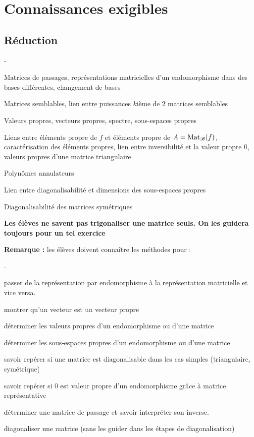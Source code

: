 \documentclass[11pt]{article}%
\begin{document}
\newpage


\section*{Connaissances exigibles}

\subsection*{Réduction}

\begin{noliste}{-}
 \item Matrices de passages, représentations matricielles d'un 
  endomorphisme dans des bases différentes, changement de bases
  \item Matrices semblables, lien entre puissances $k$ième de $2$ 
  matrices semblables
  \item Valeurs propres, vecteurs propres, spectre, sous-espaces propres
  \item Liens entre éléments propre de $f$ et éléments propre de 
  $A={\rm{Mat}}_{\mathscr{B}}(f)$, caractérisation des éléments propres, lien entre 
  inversibilité et la valeur propre $0$, valeurs propres d'une matrice 
  triangulaire
  \item Polynômes annulateurs
  \item Lien entre diagonalisabilité et dimensions des sous-espaces 
  propres
  \item Diagonalisabilité des matrices symétriques
  \item {\bf Les élèves ne savent pas trigonaliser une matrice seuls.
  On les guidera toujours pour un tel exercice}
\end{noliste}

\noindent
{\bf Remarque :} les élèves doivent connaître les méthodes pour :
\begin{noliste}{-}
\item passer de la représentation par endomorphisme à la 
représentation matricielle et vice versa.
\item montrer qu'un vecteur est un vecteur propre
\item déterminer les valeurs propres d'un endomorphisme ou 
d'une matrice
\item déterminer les sous-espaces propres d'un endomorphisme 
ou d'une matrice
\item savoir repérer si une matrice est diagonalisable dans les cas 
simples (triangulaire, symétrique)
\item savoir repérer si $0$ est valeur propre d'un endomorphisme grâce 
à matrice représentative
\item déterminer une matrice de passage et savoir interpréter 
son inverse.
\item diagonaliser une matrice (sans les guider dans les étapes de 
diagonalisation)
\end{noliste}
\end{document}
